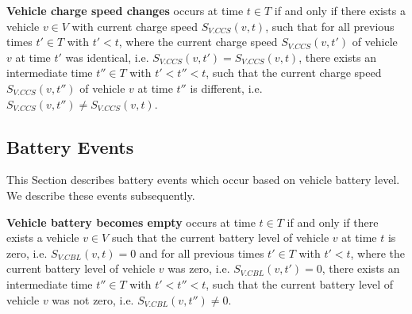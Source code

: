\documentclass[graybox]{svmult}
\begin{document}

\vspace{4mm}
\noindent
\textbf{Vehicle charge speed changes}
occurs at time $t \in T$ if and only if there exists a vehicle $v \in V$ with current charge speed $S_{V.CCS}(v, t)$, such that for all previous times $t' \in T$ with $t' < t$, where the current charge speed $S_{V.CCS}(v,t')$ of vehicle $v$ at time $t'$ was identical, i.e. $S_{V.CCS}(v,t') = S_{V.CCS}(v,t)$, there exists an intermediate time $t'' \in T$ with $t' < t'' < t$, such that the current charge speed $S_{V.CCS}(v,t'')$ of vehicle $v$ at time $t''$ is different, i.e. $S_{V.CCS}(v,t'') \neq S_{V.CCS}(v,t)$.

\vspace{-2mm}

\noindent
\subsection{Battery Events}
\label{sec:battery-events}
This Section describes battery events which occur based on vehicle battery level. We describe these events subsequently.
\vspace{4mm}

\noindent
\textbf{Vehicle battery becomes empty}
occurs at time $t \in T$ if and only if there exists a vehicle $v \in V$ such that the current battery level of vehicle $v$ at time $t$ is zero, i.e. $S_{V.CBL}(v,t) = 0$ and for all previous times $t' \in T$ with $t' < t$, where the current battery level of vehicle $v$ was zero, i.e. $S_{V.CBL}(v,t') = 0$, there exists an intermediate time $t'' \in T$ with $t' < t'' < t$, such that the current battery level of vehicle $v$ was not zero, i.e. $S_{V.CBL}(v,t'') \neq 0$.
\end{document}
